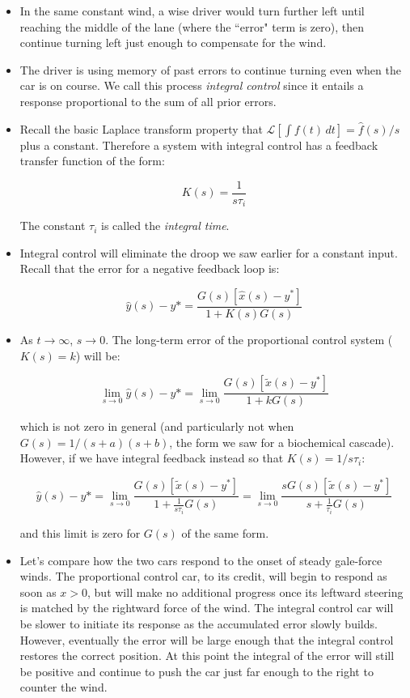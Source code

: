 \documentclass{article}
\newcommand{\Lapl}{\mathscr{L}}
\begin{document}
\begin{itemize}
\item In the same constant wind, a wise driver would turn further left until reaching the middle of the lane (where the ``error" term is zero), then continue turning left just enough to compensate for the wind.

\item The driver is using memory of past errors to continue turning even when the car is on course. We call this process \textit{integral control} since it entails a response proportional to the sum of all prior errors.

\item Recall the basic Laplace transform property that $\Lapl [ \int f(t) \, dt ] = \hat{f}(s)/s$ plus a constant. Therefore a system with integral control has a feedback transfer function of the form:

\[ K(s) = \frac{1}{s \tau_i} \]

The constant $\tau_i$ is called the \textit{integral time}.

\item Integral control will eliminate the droop we saw earlier for a constant input. Recall that the error for a negative feedback loop is:


\[ \hat{y}(s) - y* = \frac{G(s) \left[ \hat{x}(s) - y^* \right]}{1 + K(s) G(s)} \]

\item As $t \to \infty$, $s \to 0$. The long-term error of the proportional control system ($K(s)=k$)  will be:

\[   \lim_{s \to 0}  \hat{y}(s) - y* = \lim_{s \to 0} \frac{G(s) \left[ \tilde{x}(s) - y^* \right]}{1 + kG(s)} \]

which is not zero in general (and particularly not when $G(s)=1/(s+a)(s+b)$, the form we saw for a biochemical cascade). However, if we have integral feedback instead so that $K(s) = 1/s\tau_i$:

\[  \hat{y}(s) - y* = \lim_{s \to 0} \frac{G(s) \left[ \tilde{x}(s) - y^* \right]}{1 + \frac{1}{s\tau_i}  G(s)} = \lim_{s \to 0} \frac{s G(s) \left[ \tilde{x}(s) - y^* \right]}{s +  \frac{1}{\tau_i}  G(s)} \]

and this limit is zero for $G(s)$ of the same form.

\item Let's compare how the two cars respond to the onset of steady gale-force winds. The proportional control car, to its credit, will begin to respond as soon as $x>0$, but will make no additional progress once its leftward steering is matched by the rightward force of the wind. The integral control car will be slower to initiate its response as the accumulated error slowly builds. However, eventually the error will be large enough that the integral control restores the correct position. At this point the integral of the error will still be positive and continue to push the car just far enough to the right to counter the wind.


\end{itemize}
\end{document}
